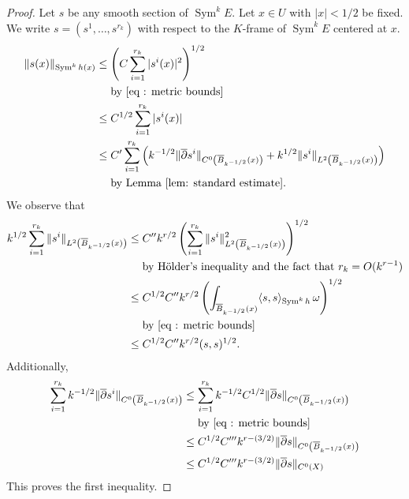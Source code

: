 \documentclass{amsart}
\theoremstyle{definition}
\theoremstyle{remark}
\numberwithin{equation}{section}
\DeclareMathOperator{\Sym}{Sym}
\begin{document}
\begin{proof}
Let $s$ be any smooth section of $\Sym^kE$. Let $x \in U$ with $|x| < 1/2$ be fixed. We write $s = (s^1, \dotsc, s^{r_k})$ with respect to the $K$-frame of $\Sym^kE$ centered at $x$. 
\begin{align*}
\|s(x)\|_{\Sym^k h(x)} & \leq  \left ( C \sum_{i=1}^{r_k} |s^i(x)|^2 \right )^{1/2} \\
    & \hspace{10pt} \text{ by \eqref{eq : metric bounds}} \\
    & \leq C^{1/2} \sum_{i=1}^{r_k} |s^i(x)| \\
    & \leq C' \sum_{i=1}^{r_k} \left ( k^{-1/2} \|\overline{\partial} s^i\|_{C^0 \left (\overline{B}_{k^{-1/2}}(x) \right )} + k^{1/2} \|s^i\|_{L^2 \left (\overline{B}_{k^{-1/2}}(x) \right )}  \right ) \\
    & \hspace{10pt} \text{ by Lemma \ref{lem: standard estimate}}.
\end{align*}
We observe that
\begin{align*}
k^{1/2} \sum_{i=1}^{r_k} \|s^i\|_{L^2\left (\overline{B}_{k^{-1/2}}(x) \right )} 
    & \leq C'' k^{ r/2} \left (  \sum_{i=1}^{r_k} \|s^i\|_{L^2\left (\overline{B}_{k^{-1/2}}(x) \right )}^2  \right )^{1/2} \\
    & \hspace{10pt} \text{ by H\"older's inequality and the fact that $r_k = O(k^{r-1})$} \\
    & \leq C^{1/2} C'' k^{r/2} \left (\int_{\overline{B}_{k^{-1/2}}(x)} \langle s, s \rangle_{\Sym^k h} \, \omega \right )^{1/2} \\
    & \hspace{10pt} \text{ by \eqref{eq : metric bounds}} \\
    & \leq C^{1/2} C'' k^{r/2} (s,s)^{1/2}.
\end{align*}
Additionally,
\begin{align*}
\sum_{i=1}^{r_k} k^{-1/2} \|\overline{\partial} s^i\|_{C^0 \left (\overline{B}_{k^{-1/2}}(x) \right )} & \leq \sum_{i=1}^{r_k} k^{-1/2} C^{1/2} \|\overline{\partial} s\|_{C^0 \left (\overline{B}_{k^{-1/2}}(x) \right )} \\
    & \hspace{10pt} \text{ by \eqref{eq : metric bounds}} \\
    & \leq C^{1/2} C''' k^{r-(3/2)} \|\overline{\partial}s\|_{C^0 \left (\overline{B}_{k^{-1/2}}(x) \right )} \\
    & \leq C^{1/2} C''' k^{r-(3/2)} \|\overline{\partial}s\|_{C^0(X)}
\end{align*}
This proves the first inequality.



\end{proof}
\end{document}
